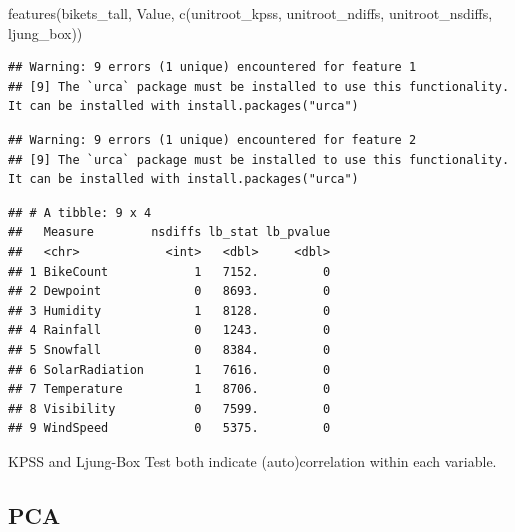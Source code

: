 \documentclass[
]{article}
\newenvironment{Shaded}{\begin{snugshade}}{\end{snugshade}}
\newcommand{\FunctionTok}[1]{\textcolor[rgb]{0.00,0.00,0.00}{#1}}
\newcommand{\NormalTok}[1]{#1}
\begin{document}
\begin{Shaded}
\begin{Highlighting}[]
\FunctionTok{features}\NormalTok{(bikets\_tall, Value, }
         \FunctionTok{c}\NormalTok{(unitroot\_kpss, unitroot\_ndiffs, unitroot\_nsdiffs, ljung\_box))}
\end{Highlighting}
\end{Shaded}

\begin{verbatim}
## Warning: 9 errors (1 unique) encountered for feature 1
## [9] The `urca` package must be installed to use this functionality. It can be installed with install.packages("urca")
\end{verbatim}

\begin{verbatim}
## Warning: 9 errors (1 unique) encountered for feature 2
## [9] The `urca` package must be installed to use this functionality. It can be installed with install.packages("urca")
\end{verbatim}

\begin{verbatim}
## # A tibble: 9 x 4
##   Measure        nsdiffs lb_stat lb_pvalue
##   <chr>            <int>   <dbl>     <dbl>
## 1 BikeCount            1   7152.         0
## 2 Dewpoint             0   8693.         0
## 3 Humidity             1   8128.         0
## 4 Rainfall             0   1243.         0
## 5 Snowfall             0   8384.         0
## 6 SolarRadiation       1   7616.         0
## 7 Temperature          1   8706.         0
## 8 Visibility           0   7599.         0
## 9 WindSpeed            0   5375.         0
\end{verbatim}

KPSS and Ljung-Box Test both indicate (auto)correlation within each
variable.

\hypertarget{pca}{%
\subsection{PCA}\label{pca}}
\end{document}
